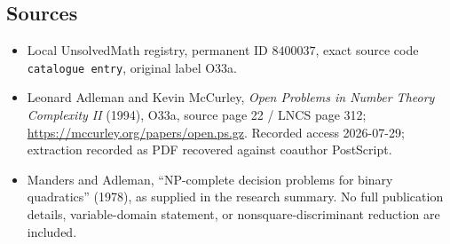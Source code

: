 \documentclass[11pt]{article}
\begin{document}
\subsection{Sources}
\begin{itemize}
\item Local UnsolvedMath registry, permanent ID \(8400037\), exact source code \texttt{catalogue entry}, original label O33a.
\item Leonard Adleman and Kevin McCurley, \emph{Open Problems in Number Theory Complexity II} (1994), O33a, source page 22 / LNCS page 312; \url{https://mccurley.org/papers/open.ps.gz}. Recorded access 2026-07-29; extraction recorded as PDF recovered against coauthor PostScript.
\item Manders and Adleman, ``NP-complete decision problems for binary quadratics'' (1978), as supplied in the research summary. No full publication details, variable-domain statement, or nonsquare-discriminant reduction are included.
\end{itemize}
\end{document}
